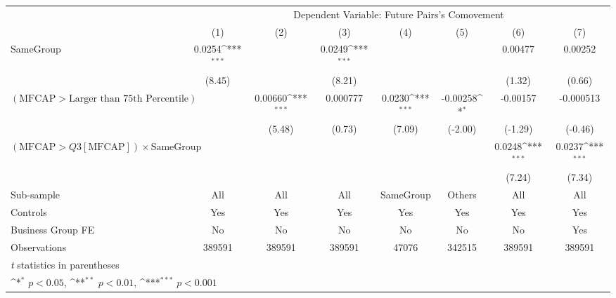 {
\def\sym#1{\ifmmode^{#1}\else\(^{#1}\)\fi}
\begin{tabular}{l*{7}{c}}
\hline\hline
                &\multicolumn{7}{c}{Dependent Variable:  Future Pairs's Comovement}                                                                  \\\cmidrule(lr){2-8}
                &\multicolumn{1}{c}{(1)}         &\multicolumn{1}{c}{(2)}         &\multicolumn{1}{c}{(3)}         &\multicolumn{1}{c}{(4)}         &\multicolumn{1}{c}{(5)}         &\multicolumn{1}{c}{(6)}         &\multicolumn{1}{c}{(7)}         \\
\hline
SameGroup       &   0.0254\sym{***}&                  &   0.0249\sym{***}&                  &                  &  0.00477         &  0.00252         \\
                &   (8.45)         &                  &   (8.21)         &                  &                  &   (1.32)         &   (0.66)         \\
[1em]
$ (\text{MFCAP} > \text{Larger than 75th Percentile}) $ &                  &  0.00660\sym{***}& 0.000777         &   0.0230\sym{***}& -0.00258\sym{*}  & -0.00157         &-0.000513         \\
                &                  &   (5.48)         &   (0.73)         &   (7.09)         &  (-2.00)         &  (-1.29)         &  (-0.46)         \\
[1em]
 $ (\text{MFCAP} > Q3[\text{MFCAP}]) \times {\text{SameGroup}} $ &                  &                  &                  &                  &                  &   0.0248\sym{***}&   0.0237\sym{***}\\
                &                  &                  &                  &                  &                  &   (7.24)         &   (7.34)         \\
\hline
Sub-sample      &      All         &      All         &      All         &SameGroup         &   Others         &      All         &      All         \\
Controls        &      Yes         &      Yes         &      Yes         &      Yes         &      Yes         &      Yes         &      Yes         \\
Business Group FE&       No         &       No         &       No         &       No         &       No         &       No         &      Yes         \\
Observations    &   389591         &   389591         &   389591         &    47076         &   342515         &   389591         &   389591         \\
\hline\hline
\multicolumn{8}{l}{\footnotesize \textit{t} statistics in parentheses}\\
\multicolumn{8}{l}{\footnotesize \sym{*} \(p<0.05\), \sym{**} \(p<0.01\), \sym{***} \(p<0.001\)}\\
\end{tabular}
}
